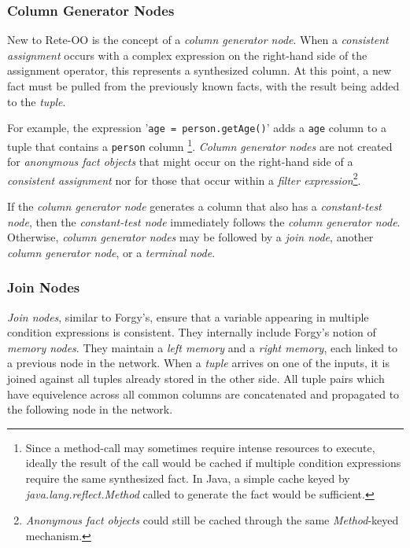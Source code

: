 \documentclass[10pt,twocolumn,letterpaper,colorhighlight]{article}
\begin{document}
\subsubsection{Column Generator Nodes}

New to Rete-OO is the concept of a \emph{column generator node}.
When a \emph{consistent assignment} occurs with a complex
expression on the right-hand side of the assignment operator, this
represents a synthesized column. At this point, a new fact must
be pulled from the previously known facts, with the result being
added to the \emph{tuple}.

For example, the expression '\verb|age = person.getAge()|' adds 
a \verb|age| column to a tuple that contains a \verb|person| column%
\footnote{Since a method-call may sometimes require intense resources to
execute, ideally the result of the call would be cached if multiple
condition expressions require the same synthesized fact.  In Java,
a simple cache keyed by \emph{java.lang.reflect.Method} called
to generate the fact would be sufficient.}.
\emph{Column generator nodes} are not created for \emph{anonymous
fact objects} that might occur on the right-hand side of a
\emph{consistent assignment} nor for those that occur within
a \emph{filter expression}\footnote{\emph{Anonymous fact objects}
could still be cached through the same \emph{Method}-keyed
mechanism.}.

If the \emph{column generator node} generates a column that also
has a \emph{constant-test node}, then the \emph{constant-test node}
immediately follows the \emph{column generator node}. Otherwise, 
\emph{column generator nodes} may be followed by a \emph{join
node}, another \emph{column generator node}, or a \emph{terminal
node}.

\subsubsection{Join Nodes}

\emph{Join nodes}, similar to Forgy's, ensure that a variable
appearing in multiple condition expressions is consistent. They
internally include Forgy's notion of \emph{memory nodes}.  They
maintain a \emph{left memory} and a \emph{right memory}, each
linked to a previous node in the network.  When a \emph{tuple} arrives
on one of the inputs, it is joined against all tuples already stored
in the other side.  All tuple pairs which have equivelence across 
all common columns are concatenated and propagated to the following
node in the network.
\end{document}
